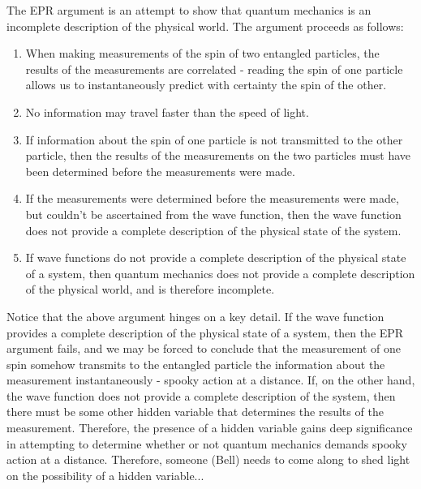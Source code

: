 The EPR argument is an attempt to show that quantum mechanics is an incomplete
description of the physical world. The argument proceeds as follows:
\begin{enumerate}
    \item When making measurements of the spin of two entangled particles, the
          results of the measurements are correlated - reading the spin of one 
          particle allows us to instantaneously predict with certainty the spin
          of the other.
    \item No information may travel faster than the speed of light.
    \item If information about the spin of one particle is not transmitted to
          the other particle, then the results of the measurements on the two
          particles must have been determined before the measurements were made.
    \item If the measurements were determined before the measurements were made,
          but couldn't be ascertained from the wave function, then the wave
          function does not provide a complete description of the physical
          state of the system.
    \item If wave functions do not provide a complete description of the
          physical state of a system, then quantum mechanics does not provide a 
          complete description of the physical world, and is therefore
          incomplete.
\end{enumerate}

Notice that the above argument hinges on a key detail. If the wave function
provides a complete description of the physical state of a system, then the 
EPR argument fails, and we may be forced to conclude that the measurement of one
spin somehow transmits to the entangled particle the information about the
measurement instantaneously - spooky action at a distance. If, on the other hand,
the wave function does not provide a complete description of the system, then
there must be some other hidden variable that determines the results of the
measurement. Therefore, the presence of a hidden variable gains deep
significance in attempting to determine whether or not quantum mechanics demands
spooky action at a distance. Therefore, someone (Bell) needs to come along to shed light on
the possibility of a hidden variable...
